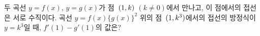 두 곡선 $y=f(x)$, $y=g(x)$가 점~$(1{,}\mkern3mu\mathopen{}k)$ $(k\ne 0)$에서 만나고, 이 점에서의 접선은 서로 수직이다. 곡선 $y=f(x)\{g(x)\}^2$ 위의 점~$(1{,}\mkern3mu\mathopen{}k^3)$에서의 접선의 방정식이 $y=k^3$일 때, $f'(1)-g'(1)$의 값은? 
